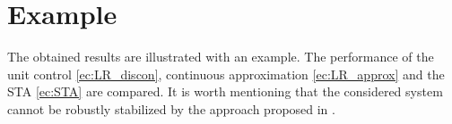 \documentclass[onecolumn]{IEEEtran}
\begin{document}


\section{Example}
\label{sec:Example}

The obtained results are illustrated with an example. 
The performance of  the unit control \eqref{ec:LR_discon}, continuous approximation \eqref{ec:LR_approx} and the STA \eqref{ec:STA} {are compared.} It is worth mentioning that the considered system  cannot be {robustly} stabilized by the approach proposed in \cite{Wu2004,Wu2009}. 

\end{document}
